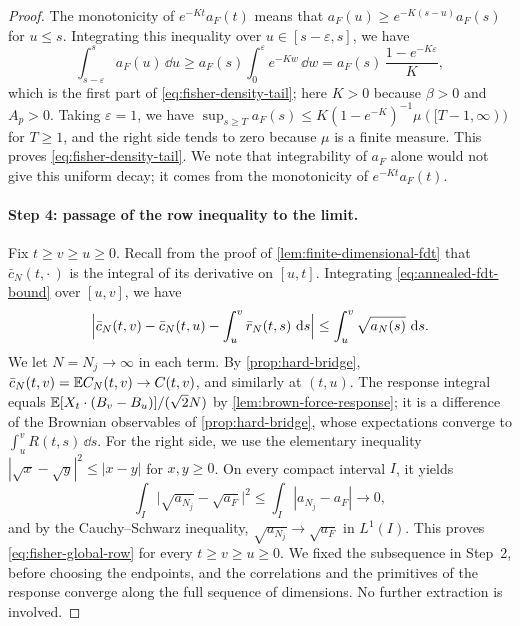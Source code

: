 \begin{proof}
The monotonicity of $e^{-Kt}a_F(t)$ means that $a_F(u)\ge e^{-K(s-u)}a_F(s)$ for $u\le s$. Integrating this inequality over $u\in[s-\varepsilon,s]$, we have
\[
 \int_{s-\varepsilon}^sa_F(u)\,\dd u\ge a_F(s)\int_0^\varepsilon e^{-Kw}\,\dd w=a_F(s)\,\frac{1-e^{-K\varepsilon}}{K},
\]
which is the first part of \eqref{eq:fisher-density-tail}; here $K>0$ because $\beta>0$ and $A_p>0$. Taking $\varepsilon=1$, we have $\sup_{s\ge T}a_F(s)\le K(1-e^{-K})^{-1}\mu([T-1,\infty))$ for $T\ge1$, and the right side tends to zero because $\mu$ is a finite measure. This proves \eqref{eq:fisher-density-tail}. We note that integrability of $a_F$ alone would not give this uniform decay; it comes from the monotonicity of $e^{-Kt}a_F(t)$.

\paragraph{Step 4: passage of the row inequality to the limit.}
Fix $t\ge v\ge u\ge0$. Recall from the proof of \cref{lem:finite-dimensional-fdt} that $\bar c_N(t,\cdot\,)$ is the integral of its derivative on $[u,t]$. Integrating \eqref{eq:annealed-fdt-bound} over $[u,v]$, we have
\[
 \Bigl|\bar c_N(t,v)-\bar c_N(t,u)-\int_u^v\bar r_N(t,s)\,\mathop{}\!\mathrm d s\Bigr|
 \le\int_u^v\sqrt{a_N(s)}\,\mathop{}\!\mathrm d s.
\]
We let $N=N_j\to\infty$ in each term. By \cref{prop:hard-bridge}, $\bar c_N(t,v)=\mathbb E C_N(t,v)\to C(t,v)$, and similarly at $(t,u)$. The response integral equals $\mathbb E[X_t\cdot(B_v-B_u)]/(\sqrt2N)$ by \cref{lem:brown-force-response}; it is a difference of the Brownian observables of \cref{prop:hard-bridge}, whose expectations converge to $\int_u^vR(t,s)\,\dd s$. For the right side, we use the elementary inequality $|\sqrt x-\sqrt y|^2\le|x-y|$ for $x,y\ge0$. On every compact interval $I$, it yields
\[
 \int_I\bigl|\sqrt{a_{N_j}}-\sqrt{a_F}\bigr|^2\le\int_I|a_{N_j}-a_F|\longrightarrow0,
\]
and by the Cauchy--Schwarz inequality, $\sqrt{a_{N_j}}\to\sqrt{a_F}$ in $L^1(I)$. This proves \eqref{eq:fisher-global-row} for every $t\ge v\ge u\ge0$. We fixed the subsequence in Step~2, before choosing the endpoints, and the correlations and the primitives of the response converge along the full sequence of dimensions. No further extraction is involved.


\end{proof}
